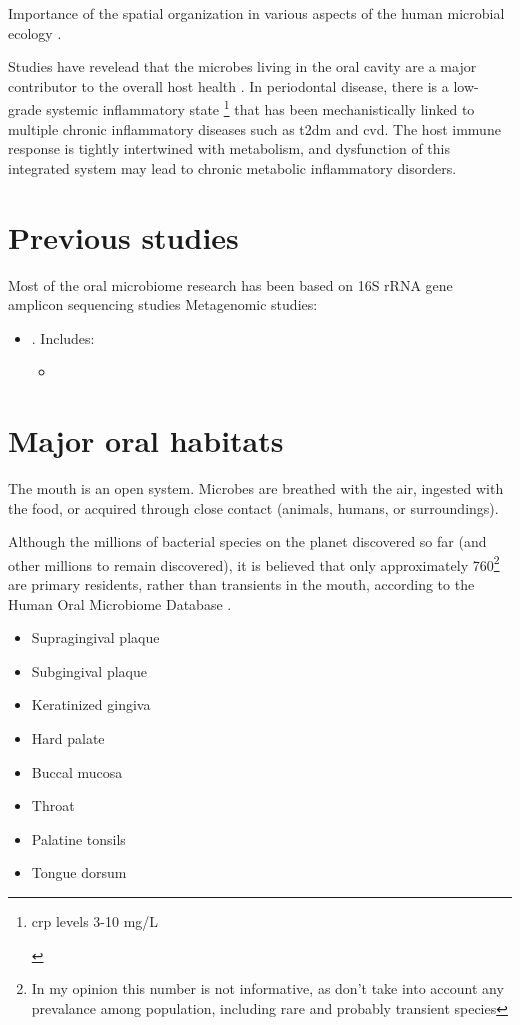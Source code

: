 Importance of the spatial organization in various aspects of the human microbial ecology \cite{Proctor2017}.

Studies have revelead that the microbes living in the oral cavity are a major contributor to the overall host health 
\cite{Hajishengallis2021}. In periodontal disease, there is a low-grade systemic inflammatory state
\footnote{
    \begin{definition}
        \acrfull{crp} levels 3-10 mg/L
    \end{definition}
}
that has been mechanistically linked to multiple chronic inflammatory diseases such as \acrfull{t2dm}
and \acrfull{cvd}. The host immune response is tightly intertwined with metabolism,
and dysfunction of this integrated system may lead to chronic metabolic inflammatory disorders.

\section{Previous studies}
Most of the oral microbiome research has been based on 16S rRNA gene amplicon sequencing studies \cite{Escapa2018}
Metagenomic studies:
\begin{itemize}
    \item {}. Includes:
    \begin{itemize}
        \item 
    \end{itemize}
\end{itemize}

\section{Major oral habitats}
The mouth is an open system. Microbes are breathed with the air, ingested with the food, or acquired through close 
contact (animals, humans, or surroundings). 

Although the millions of bacterial species on the planet discovered so far (and other millions to remain discovered), 
it is believed that only approximately 760\footnote{In my opinion this number is not informative, as don't 
take into account any prevalance among population, including rare and probably transient species} are primary residents, rather than transients in the mouth, according to the 
Human Oral Microbiome Database \cite{Escapa2018} .
\begin{itemize}
    \item Supragingival plaque
    \item Subgingival plaque 
    \item Keratinized gingiva 
    \item Hard palate 
    \item Buccal mucosa 
    \item Throat 
    \item Palatine tonsils 
    \item Tongue dorsum 
\end{itemize}

